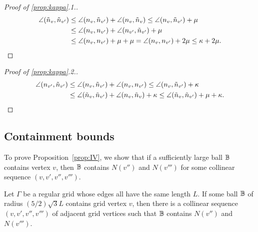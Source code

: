 \begin{proof}[Proof of \ref{prop:kappa}.1.]
\begin{align*}
\angle(\tilde{n}_v,\tilde{n}_{v'}) & \le \angle(n_v, \tilde{n}_{v'}) + \angle(n_v, \tilde{n}_v)
              \le \angle(n_v, \tilde{n}_{v'}) + \mu \\
             & \le \angle(n_v, n_{v'}) + \angle(n_{v'}, \tilde{n}_{v'}) + \mu \\
             & \le \angle(n_v, n_{v'}) + \mu + \mu 
               = \angle(n_v,n_{v'}) + 2 \mu \le \kappa+ 2 \mu.
\end{align*}
\end{proof}


\begin{proof}[Proof of \ref{prop:kappa}.2.]
\begin{align*}
\angle(n_{v'},\tilde{n}_{v'}) & \le \angle(n_v,\tilde{n}_{v'}) + \angle(n_v, n_{v'})
  \le \angle(n_v,\tilde{n}_{v'}) + \kappa \\
& \le \angle(\tilde{n}_v, \tilde{n}_{v'}) + \angle(n_v,\tilde{n}_v) + \kappa
  \le \angle(\tilde{n}_v, \tilde{n}_{v'}) + \mu + \kappa.
\end{align*}
\end{proof}

\subsection{Containment bounds}

To prove Proposition~\ref{prop:IV},
we show that if a sufficiently large ball $\mathbb{B}$ contains vertex $v$,
then $\mathbb{B}$ contains $N(v'')$ and $N(v''')$
for some collinear sequence $(v,v',v'',v''')$.
\begin{lemma}
Let $\Gamma$ be a regular grid whose edges all have the same length $L$.
If some ball $\mathbb{B}$ of radius $(5/2) \sqrt{3}L$ contains grid vertex $v$,
then there is a collinear sequence $(v,v',v'',v''')$ 
of adjacent grid vertices
such that $\mathbb{B}$ contains $N(v'')$ and $N(v''')$.
\label{lemma:ball}
\end{lemma}

